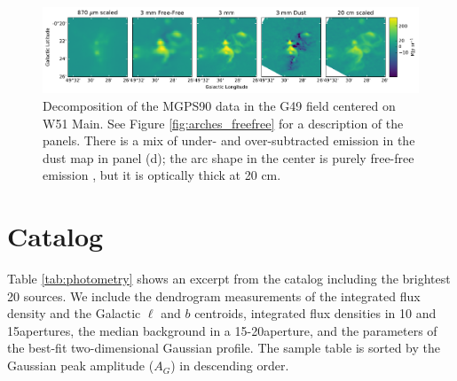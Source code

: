 \documentclass[twocolumn]{aastex62}
\begin{document}
\begin{figure}[htp]
    \includegraphics[width=17cm]{figures/G49_w51main_5panel.pdf}
    \caption{Decomposition of the MGPS90 data in the G49 field centered on W51 Main.
    See Figure \ref{fig:arches_freefree} for a description of the panels.
    There is a mix of under- and over-subtracted emission in the dust map in panel (d);
    the arc shape in the center is purely free-free emission \citep{Ginsburg2016a,Ginsburg2017a}, but
    it is optically thick at 20 cm.
}
\label{fig:w51mainfreefree}
\end{figure}

\section{Catalog}
\label{appendix:Catalog}
Table \ref{tab:photometry} shows an excerpt from the catalog including
the brightest 20 sources.
We include the dendrogram measurements of the integrated flux density and
the Galactic $\ell$ and $b$ centroids, integrated flux densities in 10\arcsec
and 15\arcsec apertures, the median background in a 15-20\arcsec aperture,
and the parameters of the best-fit two-dimensional Gaussian profile.
The sample table is sorted by the Gaussian peak amplitude ($A_G$) in descending
order.







\end{document}
